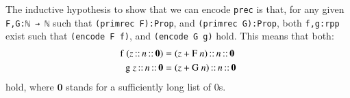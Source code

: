 \documentclass[preprint]{elsarticle}
\theoremstyle{remark}
\begin{document}
The inductive hypothesis to show that we can encode \lstinline|prec| is that, for any given \lstinline|F,G:ℕ → ℕ| such that \lstinline|(primrec F):Prop|, and \lstinline|(primrec G):Prop|, both \lstinline|f,g:rpp| exist such that \lstinline|(encode F f)|, and \lstinline|(encode G g)| hold. This means that both:
\begin{align*}
\mbox{\lstinline|f|}\ (z\mbox{\lstinline|::|}n\mbox{\lstinline|::|}\boldsymbol{0})
& = (z+\mbox{\lstinline|F|}\ n)\mbox{\lstinline|::|}n\mbox{\lstinline|::|}\boldsymbol{0}
\\
\mbox{\lstinline|g|}\ z\mbox{\lstinline|::|}n\mbox{\lstinline|::|}\boldsymbol{0}
& = (z+\mbox{\lstinline|G|}\ n)\mbox{\lstinline|::|}n\mbox{\lstinline|::|}\boldsymbol{0}
\end{align*}
hold, where $ \boldsymbol{0} $ stands for a sufficiently long list of $ 0 $s.
\end{document}
